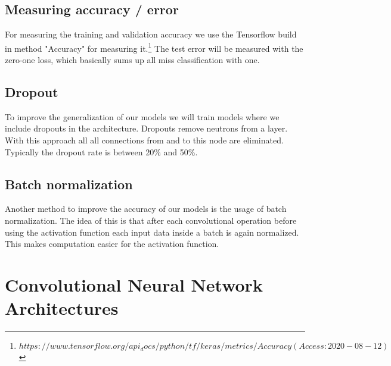 \documentclass[11pt, a4paper]{article}
\begin{document}
\subsection{Measuring accuracy / error}
For measuring the training and validation accuracy we use the Tensorflow build in method "Accuracy" for measuring it.\footnote{$https://www.tensorflow.org/api_docs/python/tf/keras/metrics/Accuracy (Access: 2020-08-12)$} The test error will be measured with the zero-one loss, which basically sums up all miss classification with one.

\subsection{Dropout}
To improve the generalization of our models we will train models where we include dropouts in the architecture. Dropouts remove neutrons from a layer. With this approach all all connections from and to this node are eliminated. Typically the dropout rate is between 20\% and 50\%.\cite[p.~188 - 189]{nndl}   

\subsection{Batch normalization}
Another method to improve the accuracy of our models is the usage of batch normalization. The idea of this is that after each convolutional operation before using the activation function each input data inside a batch is again normalized. This makes computation easier for the activation function.\cite[p.~152-153]{nndl}


\newpage
\section{Convolutional Neural Network Architectures}
\end{document}

